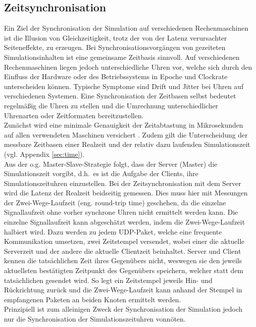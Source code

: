 \subsection{Zeitsynchronisation}
\label{sec:clock}

Ein Ziel der Synchronisation der Simulation auf verschiedenen Rechenmaschinen ist die Illusion von Gleichzeitigkeit, trotz der von der Latenz verursachter Seiteneffekte, zu erzeugen.
Bei Synchronisationsvorgängen von gezeiteten Simulationsinhalten ist eine gemeinsame Zeitbasis sinnvoll.
Auf verschiedenen Rechenmaschinen liegen jedoch unterschiedliche Uhren vor, welche sich durch den Einfluss der Hardware oder des Betriebssystems in Epoche und Clockrate unterscheiden können. Typische Symptome sind Drift und Jitter bei Uhren auf verschiedenen Systemen.
Eine Synchronisation der Zeitbasen selbst bedeutet regelmäßig die Uhren zu stellen und die Umrechnung unterschiedlicher Uhrenarten oder Zeitformaten bereitzustellen.\\
Zunächst wird eine minimale Genauigkeit der Zeitabtastung in Mikrosekunden auf allen verwendeten Maschinen versichert . Zudem gilt die Unterscheidung der messbare Zeitbasen einer Realzeit und der relativ dazu laufenden Simulationszeit (vgl. Appendix \ref{sec:time}).\\
Aus der o.g. Master-Slave-Strategie folgt, dass der Server (Master) die Simulationszeit vorgibt, d.h.~es ist die Aufgabe der Clients, ihre Simulationszeituhren einzustellen. 
Bei der Zeitsynchronisation mit dem Server wird die Latenz der Realzeit beidseitig gemessen.
Dies muss hier mit Messungen der Zwei-Wege-Laufzeit (eng. round-trip time) geschehen, da die einzelne Signallaufzeit ohne vorher synchrone Uhren nicht ermittelt werden kann. 
Die einzelne Signallaufzeit kann abgeschätzt werden, indem die Zwei-Wege-Laufzeit halbiert wird. Dazu werden zu jedem UDP-Paket, welche eine frequente Kommunikation umsetzen, zwei Zeitstempel versendet, wobei einer die aktuelle Serverzeit und der andere die aktuelle Clientzeit beinhaltet.
Server und Client kennen die tatsächlichen Zeit ihres Gegenübers nicht, weswegen sie den jeweils aktuellsten bestätigten Zeitpunkt des Gegenübers speichern, welcher statt dem tatsächlichen gesendet wird.
So legt ein Zeitstempel jeweils Hin- und Rückrichtung zurück und die Zwei-Wege-Laufzeit kann anhand der Stempel in empfangenen Paketen an beiden Knoten ermittelt werden.\\
Prinzipiell ist zum alleinigen Zweck der Synchronisation der Simulation jedoch nur die Synchronisation der Simulationszeituhren vonnöten.

